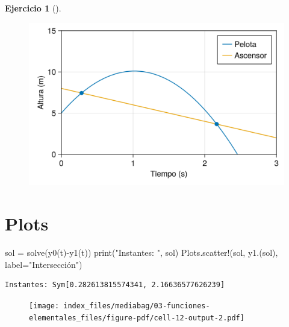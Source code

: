 \documentclass[
  a4paper,
]{scrreport}
\newenvironment{Shaded}{\begin{snugshade}}{\end{snugshade}}
\newcommand{\FunctionTok}[1]{\textcolor[rgb]{0.28,0.35,0.67}{#1}}
\newcommand{\NormalTok}[1]{\textcolor[rgb]{0.00,0.23,0.31}{#1}}
\newcommand{\OperatorTok}[1]{\textcolor[rgb]{0.37,0.37,0.37}{#1}}
\newcommand{\StringTok}[1]{\textcolor[rgb]{0.13,0.47,0.30}{#1}}
\theoremstyle{definition}
\newtheorem{exercise}{Ejercicio}[chapter]
\theoremstyle{remark}
\begin{document}
\begin{exercise}[]
\begin{tcolorbox}
\begin{figure}[H]

{\centering \includegraphics{03-funciones-elementales_files/figure-pdf/cell-11-output-1.png}

}

\end{figure}

\section{Plots}

\begin{Shaded}
\begin{Highlighting}[]
\NormalTok{sol }\OperatorTok{=} \FunctionTok{solve}\NormalTok{(}\FunctionTok{y0}\NormalTok{(t)}\FunctionTok{{-}y1}\NormalTok{(t))}
\FunctionTok{print}\NormalTok{(}\StringTok{"Instantes: "}\NormalTok{, sol)}
\NormalTok{Plots.}\FunctionTok{scatter!}\NormalTok{(sol, }\FunctionTok{y1}\NormalTok{.(sol), label}\OperatorTok{=}\StringTok{"Intersección"}\NormalTok{)}
\end{Highlighting}
\end{Shaded}

\begin{verbatim}
Instantes: Sym[0.282613815574341, 2.16636577626239]
\end{verbatim}

\begin{figure}[H]

{\centering \texttt{[image: index\_files/mediabag/03-funciones-elementales\_files/figure-pdf/cell-12-output-2.pdf]}

}

\end{figure}

\end{tcolorbox}

\end{exercise}
\end{document}
